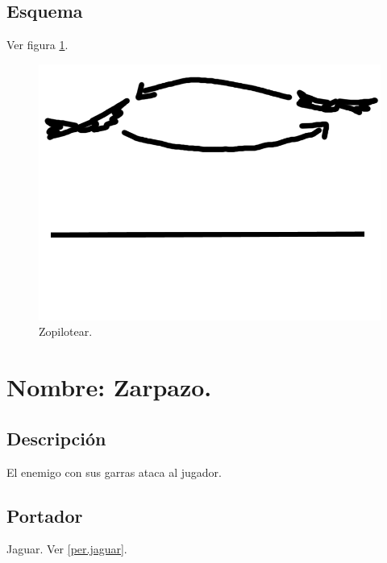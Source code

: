 		\subsection{Esquema}
		Ver figura \ref{fig:zopilotear}.
		\begin{figure}
			\centering
			\includegraphics[height=0.2 \textheight]{Imagenes/zopilotear}
			\caption{Zopilotear.}
			\label{fig:zopilotear}
		\end{figure}

			\section{Nombre: Zarpazo.} \label{hab.zarpazo}
			\subsection{Descripción}
			El enemigo con sus garras ataca al jugador.
			\subsection{Portador}
			Jaguar. Ver \ref{per.jaguar}.

